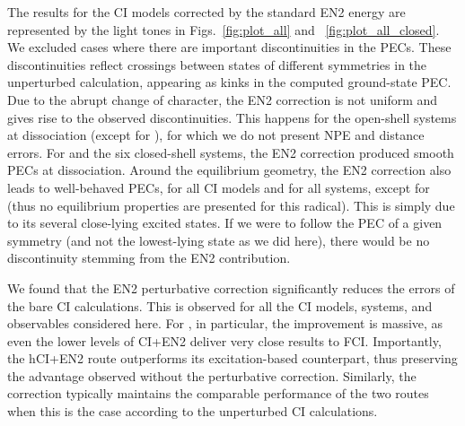 \documentclass[aip,jcp,reprint,noshowkeys,superscriptaddress]{revtex4-1}
\newcommand{\SupInf}{\textcolor{blue}{Supporting Information}}
\begin{document}
The results for the CI models corrected by the standard EN2 energy are represented by the light tones in Figs.~\ref{fig:plot_all} and ~\ref{fig:plot_all_closed}.
We excluded cases where there are important discontinuities in the PECs.
These discontinuities reflect crossings between states of different symmetries in the unperturbed calculation,
appearing as kinks in the computed ground-state PEC.
Due to the abrupt change of character, the EN2 correction is not uniform and gives rise to the observed discontinuities.
This happens for the open-shell systems at dissociation (except for ), for which we do not present NPE and distance errors.
For  and the six closed-shell systems, the EN2 correction produced smooth PECs at dissociation.
Around the equilibrium geometry, the EN2 correction also leads to well-behaved PECs, for all CI models and for all systems, except for 
(thus no equilibrium properties are presented for this radical).
This is simply due to its several close-lying excited states. \cite{}
If we were to follow the PEC of a given symmetry (and not the lowest-lying state as we did here), there would be no discontinuity stemming from the EN2 contribution.

We found that the EN2 perturbative correction significantly reduces the errors of the bare CI calculations.
This is observed for all the CI models, systems, and observables considered here.
For , in particular, the improvement is massive, as even the lower levels of CI+EN2 deliver very close results to FCI.
Importantly, the hCI+EN2 route outperforms its excitation-based counterpart, thus preserving the advantage observed without the perturbative correction.
Similarly, the correction typically maintains the comparable performance of the two routes when this is the case according to the unperturbed CI calculations.

 
\end{document}
